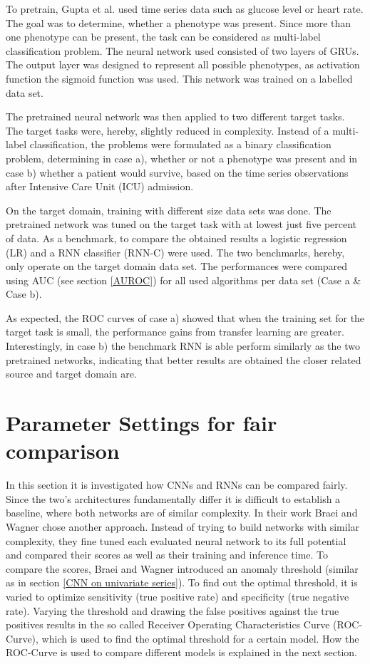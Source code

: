 To pretrain, Gupta et al. used time series data such as glucose level or heart rate. The goal was to determine, whether a phenotype was present. Since more than one phenotype can be present, the task can be considered as multi-label classification problem. The neural network used consisted of two layers of GRUs. The output layer was designed to represent all possible phenotypes, as activation function the sigmoid function was used. This network was trained on a labelled data set.

The pretrained neural network was then applied to two different target tasks. The target tasks were, hereby, slightly reduced in complexity. Instead of a multi-label classification, the problems were formulated as a binary classification problem, determining in case a), whether or not a phenotype was present and in case b) whether a patient would survive, based on the time series observations after Intensive Care Unit (ICU) admission.


On the target domain, training with different size data sets was done. The pretrained network was tuned on the target task with at lowest just five percent of data. As a benchmark, to compare the obtained results a logistic regression (LR) and a RNN classifier (RNN-C) were used. The two benchmarks, hereby, only operate on the target domain data set. The performances were compared using AUC (see section \ref{AUROC}) for all used algorithms per data set (Case a \& Case b).   

As expected, the ROC curves of case a) showed that when the training set for the target task is small, the performance gains from transfer learning are greater. Interestingly, in case b) the benchmark RNN is able perform similarly as the two pretrained networks, indicating that better results are obtained the closer related source and target domain are.


\section{Parameter Settings for fair comparison}
In this section it is investigated how CNNs and RNNs can be compared fairly. Since the two's architectures fundamentally differ it is difficult to establish a baseline, where both networks are of similar complexity. In their work Braei and Wagner \parencite*{Braei2020} chose another approach. Instead of trying to build networks with similar complexity, they fine tuned each evaluated neural network to its full potential and compared their scores as well as their training and inference time. To compare the scores, Braei and Wagner introduced an anomaly threshold (similar as in section \ref{CNN on univariate series}). To find out the optimal threshold, it is varied to optimize sensitivity (true positive rate) and specificity (true negative rate). Varying the threshold and drawing the false positives against the true positives results in the so called Receiver Operating Characteristics Curve (ROC-Curve), which is used to find the optimal threshold for a certain model. How the ROC-Curve is used to compare different models is explained in the next section.

